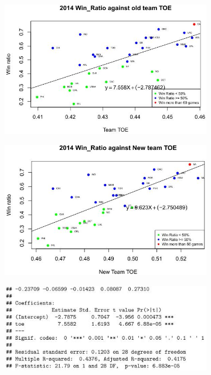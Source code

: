 \documentclass[11pt]{article}
\begin{document}
\begin{figure}[h!]
  \centering
  \begin{subfigure}[b]{0.45\linewidth}
    \includegraphics[width=\linewidth]{14old.jpg}
  \end{subfigure}
  \begin{subfigure}[b]{0.45\linewidth}
    \includegraphics[width=\linewidth]{14new.jpg}
  \end{subfigure}
  \begin{subfigure}[b]{0.42\linewidth}
    \includegraphics[width=\linewidth]{14oldsummary.jpg}

\end{subfigure}
\end{figure}
\end{document}
